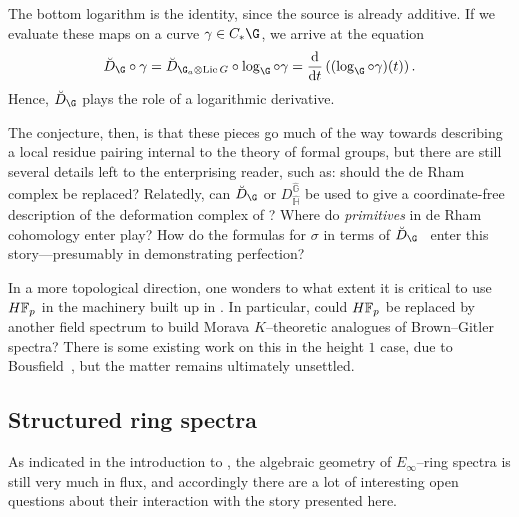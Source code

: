 \begin{enumerate}
    \begin{center}
    \end{center}
    The bottom logarithm is the identity, since the source is already additive.  If we evaluate these maps on a curve \(\gamma \in C_* \G\), we arrive at the equation~\cite[V.8.5]{LazardCFGs} \[\breve D_{\G} \circ \gamma = \breve D_{\G_a \otimes \Lie G} \circ \log_{\G} \circ \gamma = \frac{\mathrm d}{\mathrm dt} \left( (\log_\G \circ \gamma)(t) \right).\]  Hence, \(\breve D_{\G}\) plays the role of a logarithmic derivative.
\end{enumerate}

The conjecture, then, is that these pieces go much of the way towards describing a local residue pairing internal to the theory of formal groups, but there are still several details left to the enterprising reader, such as: should the de Rham complex be replaced?  Relatedly, can \(\breve D_{\G}\) or \(D_{\widehat{\mathbb H}}^{\widehat{\mathbb G}}\) be used to give a coordinate-free description of the deformation complex of ?  Where do \emph{primitives} in de Rham cohomology enter play?  How do the formulas for \(\sigma\) in terms of \(\breve D_{\G}\)~\cite[VII.6.14]{LazardCFGs} enter this story---presumably in demonstrating perfection?

In a more topological direction, one wonders to what extent it is critical to use \(\HFp\) in the machinery built up in .  In particular, could \(\HFp\) be replaced by another field spectrum to build Morava \(K\)--theoretic analogues of Brown--Gitler spectra?  There is some existing work on this in the height \(1\) case, due to Bousfield~\cite{BousfieldLambdaRings}, but the matter remains ultimately unsettled.





\subsection*{Structured ring spectra}

As indicated in the introduction to , the algebraic geometry of \(E_\infty\)--ring spectra is still very much in flux, and accordingly there are a lot of interesting open questions about their interaction with the story presented here.

